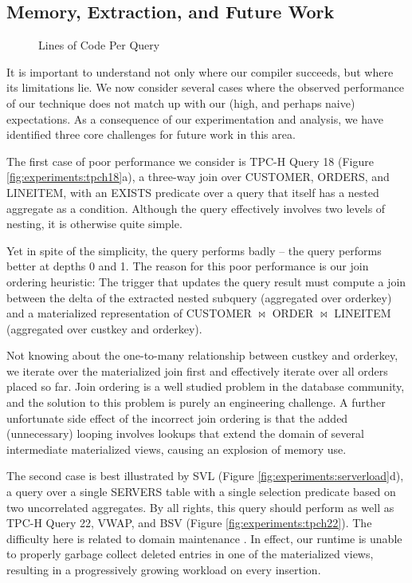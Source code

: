 \subsection{Memory, Extraction, and Future Work}
\label{sec:experiments:future}

\begin{figure}
\begin{center}

\caption{Lines of Code Per Query}
\label{fig:experiments:loc}
\end{center}
\end{figure}

It is important to understand not only where our compiler succeeds, but where its limitations lie.  We now consider several cases where the observed performance of our technique does not match up with our (high, and perhaps naive) expectations.  As a consequence of our experimentation and analysis, we have identified three core challenges for future work in this area.

The first case of poor performance we consider is TPC-H Query 18 (Figure \ref{fig:experiments:tpch18}a), a three-way join over CUSTOMER, ORDERS, and LINEITEM, with an EXISTS predicate over a query that itself has a nested aggregate as a condition.  Although the query effectively involves two levels of nesting, it is otherwise quite simple.

Yet in spite of the simplicity, the query performs badly -- the query performs better at depths 0 and 1.  The reason for this poor performance is our join ordering heuristic: The trigger that updates the query result must compute a join between the delta of the extracted nested subquery (aggregated over orderkey) and a materialized representation of CUSTOMER $\bowtie$ ORDER $\bowtie$ LINEITEM (aggregated over custkey and orderkey).  

Not knowing about the one-to-many relationship between custkey and orderkey, we iterate over the materialized join first and effectively iterate over all orders placed so far.  Join ordering is a well studied problem in the database community, and the solution to this problem is purely an engineering challenge.  A further unfortunate side effect of the incorrect join ordering is that the added (unnecessary) looping involves lookups that extend the domain of several intermediate materialized views, causing an explosion of memory use.

The second case is best illustrated by SVL (Figure \ref{fig:experiments:serverload}d), a query over a single SERVERS table with a single selection predicate based on two uncorrelated aggregates.  By all rights, this query should perform as well as TPC-H Query 22, VWAP, and BSV (Figure \ref{fig:experiments:tpch22}).  The difficulty here is related to domain maintenance .  In effect, our runtime is unable to properly garbage collect deleted entries in one of the materialized views, resulting in a progressively growing workload on every insertion.  

